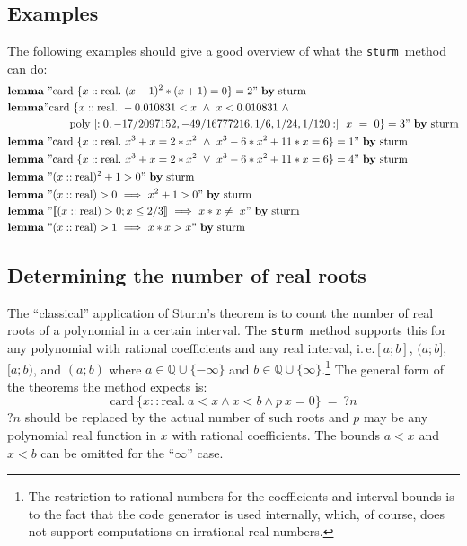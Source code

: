\documentclass[11pt,a4paper,oneside]{article}
\newcommand{\ie}{i.\,e.}
\newcommand{\QQ}{\mathbb{Q}}
\newcommand{\sturm}{\texttt{sturm}}
\newcommand{\lemma}{\textbf{lemma}}
\newcommand{\card}{\textrm{card}}
\newcommand{\real}{\textrm{real}}
\begin{document}
\subsection{Examples}
The following examples should give a good overview of what the \sturm\ method can do:
\begin{align*}
&\lemma\ "\card\ \{x::\real.\ (x - 1)^2 * (x + 1) = 0\} = 2"\ \textrm{\textbf{by}\ sturm}\\
&\textbf{lemma} "\mathrm{card}\ \{x::\mathrm{real}.\ -0.010831 < x\ \wedge\ x < 0.010831\ \wedge\\
&\hskip20mm \mathrm{poly}\ [:0, -17/2097152, -49/16777216, 1/6, 1/24, 1/120:]\ \ x\ =\ 0\} = 3"\ \textrm{\textbf{by}\ sturm}\\
&\lemma\ "\card\ \{x::\real.\ x^3 + x = 2*x^2\ \wedge\ x^3-6*x^2+11*x=6\} = 1"\ \textrm{\textbf{by}\ sturm}\\
&\lemma\ "\card\ \{x::\real.\ x^3 + x = 2*x^2\ \vee\ x^3-6*x^2+11*x=6\} = 4"\ \textrm{\textbf{by}\ sturm}\\
&\lemma\ "(x::\real)^2+1 > 0"\ \textrm{\textbf{by}\ sturm}\\
&\lemma\ "(x::\real) > 0\ \Longrightarrow\ x^2+1 > 0"\ \textrm{\textbf{by}\ sturm}\\
&\lemma\ "\llbracket (x::\real) > 0; x \leq 2/3\rrbracket\ \Longrightarrow\ x*x \neq\ x"\ \textrm{\textbf{by}\ sturm}\\
&\lemma\ "(x::\real) > 1\ \Longrightarrow\ x*x > x"\ \textrm{\textbf{by}\ sturm}\\
\end{align*}

\subsection{Determining the number of real roots}
The \enquote{classical} application of Sturm's theorem is to count the number of real roots of a polynomial in a certain interval. The \sturm\ method supports this for any polynomial with rational coefficients and any real interval, \ie $[a;b]$, $(a;b]$, $[a;b)$, and $(a;b)$ where $a\in\QQ\cup\{-\infty\}$ and $b\in\QQ\cup\{\infty\}$.\footnote{The restriction to rational numbers for the coefficients and interval bounds is to the fact that the code generator is used internally, which, of course, does not support computations on irrational real numbers.} The general form of the theorems the method expects is:
$$\card\ \{x::\real.\ a < x \wedge x < b \wedge p\ x = 0\}\ =\ ?n$$
$?n$ should be replaced by the actual number of such roots and $p$ may be any polynomial real function in $x$ with rational coefficients. The bounds $a < x$ and $x < b$ can be omitted for the \enquote{$\infty$} case.\\
\end{document}

